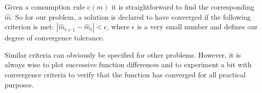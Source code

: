 \documentclass[titlepage, headings=optiontotocandhead]{econark}
\begin{document}
{Given a consumption rule $\mathrm{c}(m)$ it is straightforward to find
the corresponding $\hat{m}$.  So for our problem, a solution is declared
to have converged if the following criterion is met:
$\left|\hat{m}_{t+1}-\hat{m}_{t}\right| < \epsilon$, where $\epsilon$ is
a very small number and defines our degree of convergence tolerance.

Similar criteria can obviously be specified for other problems.
However, it is always wise to plot successive function differences and
to experiment a bit with convergence criteria to verify that the
function has converged for all practical purposes.

}
\end{document}
